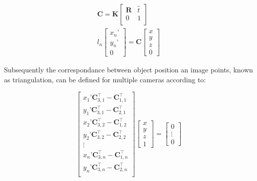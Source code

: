 \documentclass[5p,times,procedia]{elsarticle}
\begin{document}
\begin{align}
	\mathbf{C} = \mathbf{K}
	\begin{bmatrix}
		\mathbf{R} & \hat{t} \\
		0 & 1 \\
	\end{bmatrix} \\
	l_{n}
	\begin{bmatrix}
		x_n’ \\
		y_n’ \\
		0
	\end{bmatrix}
	= \mathbf{C}
	\begin{bmatrix}
		x \\
		y \\
		z \\
		0
	\end{bmatrix}
\end{align}

Subsequently the correspondance between object position an image points, known as triangulation, can be defined for multiple cameras according to:


\begin{equation}
	\label{eqn:triangulation}
	\begin{bmatrix}
		x_{1}’ \mathbf{C}_{3,1}^{\top} - \mathbf{C}_{1,1}^{\top}\\
		y_{1}’ \mathbf{C}_{3,1}^{\top} - \mathbf{C}_{2,1}^{\top}\\
		x_{2}’ \mathbf{C}_{3,2}^{\top} - \mathbf{C}_{1,2}^{\top}\\
		y_{2}’ \mathbf{C}_{3,2}^{\top} - \mathbf{C}_{2,2}^{\top}\\
		\vdots \\
		x_{n}’ \mathbf{C}_{3,n}^{\top} - \mathbf{C}_{1,n}^{\top}\\
		y_{n}’ \mathbf{C}_{3,n}^{\top} - \mathbf{C}_{2,n}^{\top}\\
	\end{bmatrix}
	\begin{bmatrix}
		x \\
		y \\
		z \\
		1
	\end{bmatrix}
	=
	\begin{bmatrix}
		0 \\
		\vdots \\
		0
	\end{bmatrix}
\end{equation}
\end{document}
